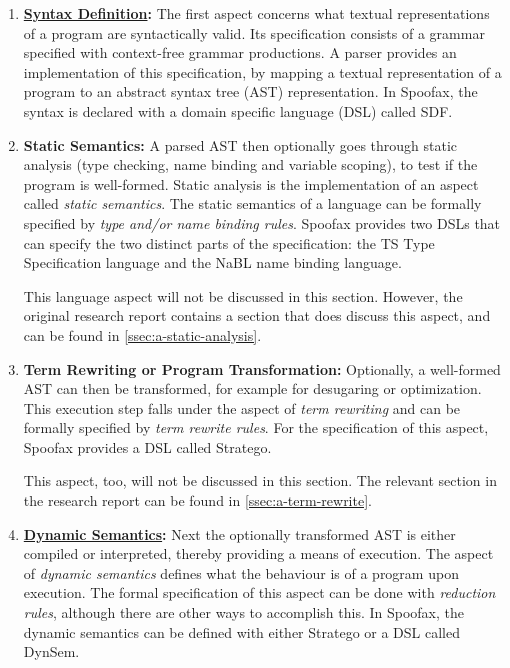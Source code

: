 \begin{enumerate}
\item \textbf{\hyperref[ssec:syntax-def]{Syntax Definition}:} The first aspect
  concerns what textual representations of a program are syntactically
  valid. Its specification consists of a grammar specified with context-free
  grammar productions. A parser provides an implementation of this
  specification, by mapping a textual representation of a program to an abstract
  syntax tree (AST) representation. In Spoofax, the syntax is declared with a
  domain specific language (DSL) called SDF.
\item \textbf{Static Semantics:} A parsed AST then optionally goes through
  static analysis (type checking, name binding and variable scoping), to test if
  the program is well-formed. Static analysis is the implementation of an aspect
  called \textit{static semantics}. The static semantics of a language can be
  formally specified by \textit{type and/or name binding rules}. Spoofax
  provides two DSLs that can specify the two distinct parts of the
  specification: the TS Type Specification language and the NaBL name binding
  language.

  This language aspect will not be discussed in this section. However, the
  original research report contains a section that does discuss this aspect, and
  can be found in \cref{ssec:a-static-analysis}.
\item \textbf{Term Rewriting or Program Transformation:} Optionally, a
  well-formed AST can then be transformed, for example for desugaring or
  optimization. This execution step falls under the aspect of \textit{term
    rewriting} and can be formally specified by \textit{term rewrite rules}. For
  the specification of this aspect, Spoofax provides a DSL called Stratego.

  This aspect, too, will not be discussed in this section. The relevant section
  in the research report can be found in \cref{ssec:a-term-rewrite}.
\item \textbf{\hyperref[ssec:dynamic-semantics]{Dynamic Semantics}:} Next the
  optionally transformed AST is either compiled or interpreted, thereby
  providing a means of execution. The aspect of \textit{dynamic semantics}
  defines what the behaviour is of a program upon execution. The formal
  specification of this aspect can be done with \textit{reduction rules},
  although there are other ways to accomplish this. In Spoofax, the dynamic
  semantics can be defined with either Stratego or a DSL called DynSem.
\end{enumerate}

